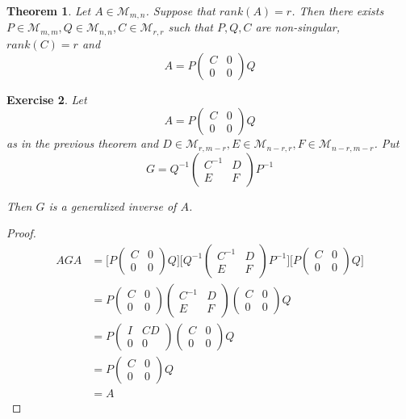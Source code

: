 \documentclass[12pt]{amsart}
\newtheorem{thm}{Theorem}[section]
\newtheorem{ex}[thm]{Exercise}
\newcommand{\MM}{\mathcal{M}}
\begin{document}
\begin{thm}
Let $A \in \MM_{m,n}$. Suppose that $rank(A) = r$. Then there exists $P \in \MM_{m,m}, Q \in \MM_{n,n}, C \in \MM_{r,r}$ such that $P,Q,C$ are non-singular, $rank(C) = r$ and 
\[
A = P
\begin{pmatrix}
C & 0 \\
0 & 0
\end{pmatrix}
Q
\]
\end{thm}

\begin{ex}
Let 
\[
A = P
\begin{pmatrix}
C & 0 \\
0 & 0
\end{pmatrix}
Q
\]
as in the previous theorem and $D \in \MM_{r,m-r}, E \in \MM_{n-r, r}, F \in \MM_{n-r, m-r}$. Put 
\[
G = Q^{-1}
\begin{pmatrix}
C^{-1} & D \\
E & F
\end{pmatrix}
P^{-1}
\]

Then $G$ is a generalized inverse of $A$.
 
\end{ex}

\begin{proof}\
\begin{align*}
AGA 
&= \bigg[P
\begin{pmatrix}
C &0 \\
0 & 0
\end{pmatrix}
Q \bigg]\bigg[Q^{-1}
\begin{pmatrix}
C ^{-1}&D \\
E & F
\end{pmatrix}
P^{-1} \bigg] \bigg[P
\begin{pmatrix}
C &0 \\
0 & 0
\end{pmatrix}
Q\bigg] \\
&= P
\begin{pmatrix}
C &0 \\
0 & 0
\end{pmatrix}
\begin{pmatrix}
C ^{-1}&D \\
E & F
\end{pmatrix}
\begin{pmatrix}
C &0 \\
0 & 0
\end{pmatrix}
Q\\
&= P 
\begin{pmatrix}
I &CD \\
0 & 0
\end{pmatrix}
\begin{pmatrix}
C &0 \\
0 & 0
\end{pmatrix}
Q \\
&= P
\begin{pmatrix}
C &0 \\
0 & 0
\end{pmatrix}
Q \\
&= A
\end{align*}
\end{proof}
\end{document}
